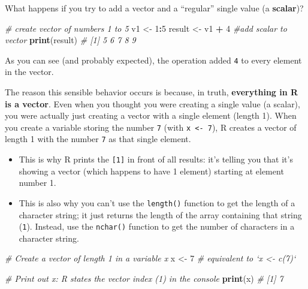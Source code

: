 \documentclass[]{book}
\newenvironment{Shaded}{\begin{snugshade}}{\end{snugshade}}
\newcommand{\KeywordTok}[1]{\textcolor[rgb]{0.13,0.29,0.53}{\textbf{#1}}}
\newcommand{\DecValTok}[1]{\textcolor[rgb]{0.00,0.00,0.81}{#1}}
\newcommand{\StringTok}[1]{\textcolor[rgb]{0.31,0.60,0.02}{#1}}
\newcommand{\CommentTok}[1]{\textcolor[rgb]{0.56,0.35,0.01}{\textit{#1}}}
\newcommand{\OperatorTok}[1]{\textcolor[rgb]{0.81,0.36,0.00}{\textbf{#1}}}
\newcommand{\NormalTok}[1]{#1}
\theoremstyle{definition}
\theoremstyle{definition}
\theoremstyle{remark}
\begin{document}
What happens if you try to add a vector and a ``regular'' single value
(a \textbf{scalar})?

\begin{Shaded}
\begin{Highlighting}[]
\CommentTok{# create vector of numbers 1 to 5}
\NormalTok{v1 <-}\StringTok{ }\DecValTok{1}\OperatorTok{:}\DecValTok{5}
\NormalTok{result <-}\StringTok{ }\NormalTok{v1 }\OperatorTok{+}\StringTok{ }\DecValTok{4}  \CommentTok{#add scalar to vector}
\KeywordTok{print}\NormalTok{(result)  }\CommentTok{# [1] 5 6 7 8 9}
\end{Highlighting}
\end{Shaded}

As you can see (and probably expected), the operation added \texttt{4}
to every element in the vector.

The reason this sensible behavior occurs is because, in truth,
\textbf{everything in R is a vector}. Even when you thought you were
creating a single value (a scalar), you were actually just creating a
vector with a single element (length 1). When you create a variable
storing the number \texttt{7} (with \texttt{x\ \textless{}-\ 7}), R
creates a vector of length 1 with the number \texttt{7} as that single
element.

\begin{itemize}
\item
  This is why R prints the \texttt{{[}1{]}} in front of all results:
  it's telling you that it's showing a vector (which happens to have 1
  element) starting at element number 1.
\item
  This is also why you can't use the \texttt{length()} function to get
  the length of a character string; it just returns the length of the
  array containing that string (\texttt{1}). Instead, use the
  \texttt{nchar()} function to get the number of characters in a
  character string.
\end{itemize}

\begin{Shaded}
\begin{Highlighting}[]
\CommentTok{# Create a vector of length 1 in a variable x}
\NormalTok{x <-}\StringTok{ }\DecValTok{7}  \CommentTok{# equivalent to `x <- c(7)`}

\CommentTok{# Print out x: R states the vector index (1) in the console}
\KeywordTok{print}\NormalTok{(x)  }\CommentTok{# [1] 7}
\end{Highlighting}
\end{Shaded}
\end{document}
